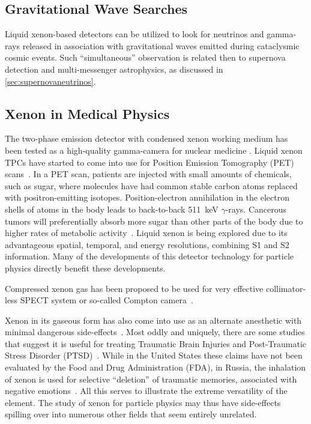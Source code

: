 \subsection{Gravitational Wave Searches}

Liquid xenon-based detectors can be utilized to look for neutrinos and gamma-rays released in association with gravitational waves emitted during cataclysmic cosmic events. Such ``simultaneous'' observation is related then to supernova detection and multi-messenger astrophysics, as discussed in \autoref{sec:supernovaneutrinos}.

\subsection{Xenon in Medical Physics}

The two-phase emission detector with condensed xenon working medium has been tested as a high-quality gamma-camera for nuclear medicine \cite{Egorov:1983}. Liquid xenon TPCs have started to come into use for Position Emission Tomography (PET) scans~\cite{Ferrario:2017sgq, GallegoManzano:2015hkg}. In a PET scan, patients are injected with small amounts of chemicals, such as sugar, where molecules have had common stable carbon atoms replaced with positron-emitting isotopes. Position-electron annihilation in the electron shells of atoms in the body leads to back-to-back 511~keV $\gamma$-rays. Cancerous tumors will preferentially absorb more sugar than other parts of the body due to higher rates of metabolic activity~\cite{Kevles:1998}. Liquid xenon is being explored due to its advantageous spatial, temporal, and energy resolutions, combining S1 and S2 information. Many of the developments of this detector technology for particle physics directly benefit these developments.

Compressed xenon gas has been proposed to be used for very effective collimator-less SPECT system or so-called Compton camera~\cite{Bolozdynya:1997ecc, Bolozdynya:1997ccc, Rogers:2004cc}.

Xenon in its gaseous form has also come into use as an alternate anesthetic with minimal dangerous side-effects~\cite{Lynch:2000}. Most oddly and uniquely, there are some studies that suggest it is useful for treating Traumatic Brain Injuries and Post-Traumatic Stress Disorder (PTSD)~\cite{Campos-Pires,Dobrovolsky}. While in the United States these claims have not been evaluated by the Food and Drug Administration (FDA), in Russia, the inhalation of xenon is used for selective ``deletion'' of traumatic memories, associated with negative emotions~\cite{Dobrovolsky}. All this serves to illustrate the extreme versatility of the element. The study of xenon for particle physics may thus have side-effects spilling over into numerous other fields that seem entirely unrelated.

